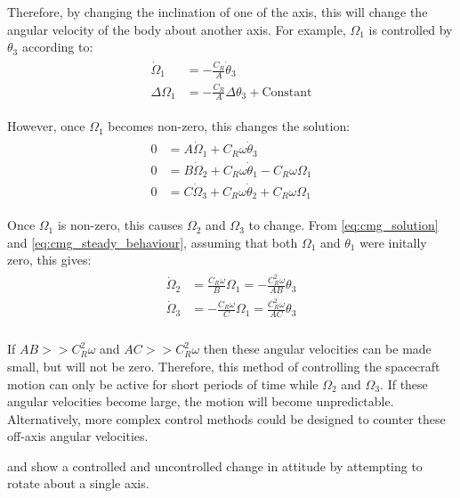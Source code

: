 \documentclass[12]{article}
\begin{document}
\begin{multicols*}{2}
Therefore, by changing the inclination of one of the axis, this will change the angular velocity of the body about another axis. For example, $\Omega_1$ is controlled by $\theta_3$ according to:
\begin{align} \label{eq:cmg_solution}
\begin{split}
\dot{\Omega}_1 &= -\frac{C_R}{A}\dot{\theta}_3 \\
\Delta\Omega_1 &= -\frac{C_R}{A}\Delta\theta_3 + \textrm{Constant}
\end{split}
\end{align}

However, once $\Omega_1$ becomes non-zero, this changes the solution:
\begin{align} \label{eq:cmg_steady_behaviour}
\begin{split}
0 &= A\dot{\Omega}_1 + C_R\omega\dot{\theta}_3 \\
0 &= B\dot{\Omega}_2 + C_R\omega\dot{\theta}_1 - C_R\omega\Omega_1 \\
0 &= C\dot{\Omega}_3 + C_R\omega\dot{\theta}_2 + C_R\omega\Omega_1
\end{split}
\end{align}

Once $\Omega_1$ is non-zero, this causes $\Omega_2$ and $\Omega_3$ to change. From \cref{eq:cmg_solution} and \cref{eq:cmg_steady_behaviour}, assuming that both $\Omega_1$ and $\theta_1$ were initally zero, this gives:
\begin{align} \label{eq:cmg_other_rotation}
\begin{split}
\dot{\Omega}_2 &= \frac{C_R\omega}{B}\Omega_1 = -\frac{C_R^2\omega}{AB}\theta_3 \\
\dot{\Omega}_3 &= -\frac{C_R\omega}{C}\Omega_1 = \frac{C_R^2\omega}{AC}\theta_3 \\
\end{split}
\end{align}

If $AB>>C_R^2\omega$ and $AC>>C_R^2\omega$ then these angular velocities can be made small, but will not be zero. Therefore, this method of controlling the spacecraft motion can only be active for short periods of time while $\Omega_2$ and $\Omega_3$. If these angular velocities become large, the motion will become unpredictable. Alternatively, more complex control methods could be designed to counter these off-axis angular velocities.

 and  show a controlled and uncontrolled change in attitude by attempting to rotate about a single axis.


\end{multicols*}
\end{document}
